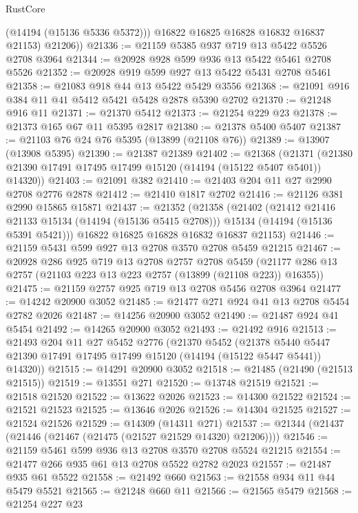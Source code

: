 \begin{lexlean}{RustCore}
\begin{coremodule}
            (@14194 (@15136 @5336 @5372)))
          @16822
          @16825
          @16828
          @16832
          @16837
          @21153)
        @21206))
@21336 := @21159 @5385 @937 @719 @13 @5422 @5526 @2708 @3964
@21344 := @20928 @928 @599 @936 @13 @5422 @5461 @2708 @5526
@21352 := @20928 @919 @599 @927 @13 @5422 @5431 @2708 @5461
@21358 := @21083 @918 @44 @13 @5422 @5429 @3556
@21368 := @21091 @916 @384 @11 @41 @5412 @5421 @5428 @2878 @5390 @2702
@21370 := @21248 @916 @11
@21371 := @21370 @5412
@21373 := @21254 @229 @23
@21378 := @21373 @165 @67 @11 @5395 @2817
@21380 := @21378 @5400 @5407
@21387 := @21103 @76 @24 @76 @5395 (@13899 (@21108 @76))
@21389 := @13907 (@13908 @5395)
@21390 := @21387 @21389
@21402 := @21368
    (@21371 (@21380 @21390 @17491 @17495 @17499 @15120 (@14194 (@15122 @5407 @5401)) @14320))
@21403 := @21091 @382
@21410 := @21403 @204 @11 @27 @2990 @2708 @2776 @2878
@21412 := @21410 @1817 @2702
@21416 := @21126 @381 @2990 @15865 @15871
@21437 := @21352
    (@21358
      (@21402
        (@21412 @21416 @21133 @15134 (@14194 (@15136 @5415 @2708)))
        @15134
        (@14194 (@15136 @5391 @5421)))
      @16822
      @16825
      @16828
      @16832
      @16837
      @21153)
@21446 := @21159 @5431 @599 @927 @13 @2708 @3570 @2708 @5459 @21215
@21467 := @20928
    @286
    @925
    @719
    @13
    @2708
    @2757
    @2708
    @5459
    (@21177 @286 @13 @2757 (@21103 @223 @13 @223 @2757 (@13899 (@21108 @223)) @16355))
@21475 := @21159 @2757 @925 @719 @13 @2708 @5456 @2708 @3964
@21477 := @14242 @20900 @3052
@21485 := @21477 @271 @924 @41 @13 @2708 @5454 @2782 @2026
@21487 := @14256 @20900 @3052
@21490 := @21487 @924 @41 @5454
@21492 := @14265 @20900 @3052
@21493 := @21492 @916
@21513 := @21493
    @204
    @11
    @27
    @5452
    @2776
    (@21370
      @5452
      (@21378 @5440 @5447 @21390 @17491 @17495 @17499 @15120 (@14194 (@15122 @5447 @5441)) @14320))
@21515 := @14291 @20900 @3052
@21518 := @21485 (@21490 (@21513 @21515))
@21519 := @13551 @271
@21520 := @13748 @21519
@21521 := @21518 @21520
@21522 := @13622 @2026
@21523 := @14300 @21522
@21524 := @21521 @21523
@21525 := @13646 @2026
@21526 := @14304 @21525
@21527 := @21524 @21526
@21529 := @14309 (@14311 @271)
@21537 := @21344 (@21437 (@21446 (@21467 (@21475 (@21527 @21529 @14320) @21206))))
@21546 := @21159 @5461 @599 @936 @13 @2708 @3570 @2708 @5524 @21215
@21554 := @21477 @266 @935 @61 @13 @2708 @5522 @2782 @2023
@21557 := @21487 @935 @61 @5522
@21558 := @21492 @660
@21563 := @21558 @934 @11 @44 @5479 @5521
@21565 := @21248 @660 @11
@21566 := @21565 @5479
@21568 := @21254 @227 @23

\end{coremodule}
\end{lexlean}
